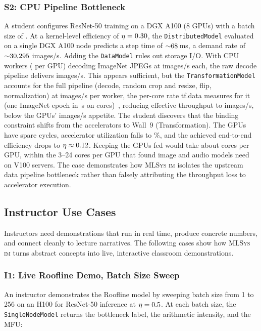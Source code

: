 \documentclass[10pt,twocolumn]{article}
\newcommand{\mlsysim}{\mbox{\textsc{MLSys}\,\textperiodcentered\,\textsc{im}}\xspace}
\begin{document}
\subsubsection{S2: CPU Pipeline Bottleneck}
A student configures ResNet-50 training on a DGX A100 (8 GPUs) with a batch size of \CaseSTwoBatch. At a kernel-level efficiency of $\eta = 0.30$, the \texttt{DistributedModel} evaluated on a single DGX A100 node predicts a step time of ${\sim}68$\,ms, a demand rate of ${\sim}30{,}295$ images/s. Adding the \texttt{DataModel} rules out storage I/O. With \CaseSTwoWorkers{} CPU workers (\CaseSTwoWorkersPerGpu{} per GPU) decoding ImageNet JPEGs at \CaseSTwoDecodeRate{} images/s each, the raw decode pipeline delivers \CaseSTwoRawSupplyImgPerS{} images/s. This appears sufficient, but the \texttt{TransformationModel} accounts for the full pipeline (decode, random crop and resize, flip, normalization) at \CaseSTwoAugmentRate{} images/s per worker, the per-core rate tf.data measures for it (one ImageNet epoch in \CaseSTwoPrepRefEpochS\,s on \CaseSTwoPrepRefCores{} cores)~\citep{murray2021tf}, reducing effective throughput to \CaseSTwoEffectiveSupplyImgPerS{} images/s, below the GPUs' \CaseSTwoDemandImgPerS{} images/s appetite. The student discovers that the binding constraint shifts from the accelerators to Wall~9 (Transformation). The GPUs have spare cycles, accelerator utilization falls to \CaseSTwoAccelUtilizationPct\%, and the achieved end-to-end efficiency drops to $\eta \approx 0.12$. Keeping the GPUs fed would take about \CaseSTwoCoresPerGpuNeeded{} cores per GPU, within the 3--24 cores per GPU that \citet{mohan2021} found image and audio models need on V100 servers. The case demonstrates how \mlsysim isolates the upstream data pipeline bottleneck rather than falsely attributing the throughput loss to accelerator execution.

\subsection{Instructor Use Cases}

Instructors need demonstrations that run in real time, produce concrete numbers, and connect cleanly to lecture narratives. The following cases show how \mlsysim turns abstract concepts into live, interactive classroom demonstrations.

\subsubsection{I1: Live Roofline Demo, Batch Size Sweep}
An instructor demonstrates the Roofline model by sweeping batch size from 1 to 256 on an H100 for ResNet-50 inference at $\eta = 0.5$. At each batch size, the \texttt{SingleNodeModel} returns the bottleneck label, the arithmetic intensity, and the MFU:
\end{document}
